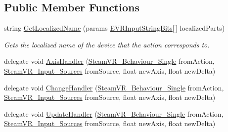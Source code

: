 \subsection*{Public Member Functions}
\begin{DoxyCompactItemize}
\item 
string \mbox{\hyperlink{class_valve_1_1_v_r_1_1_steam_v_r___behaviour___single_a352724349998074f0214563cb037a98e}{Get\+Localized\+Name}} (params \mbox{\hyperlink{namespace_valve_1_1_v_r_a05e76187bbc5846b9bfb44f6acf13912}{E\+V\+R\+Input\+String\+Bits}}\mbox{[}$\,$\mbox{]} localized\+Parts)
\begin{DoxyCompactList}\small\item\em Gets the localized name of the device that the action corresponds to. \end{DoxyCompactList}\item 
delegate void \mbox{\hyperlink{class_valve_1_1_v_r_1_1_steam_v_r___behaviour___single_ae61cad9d74c4df6b8efd9ead49b15ea9}{Axis\+Handler}} (\mbox{\hyperlink{class_valve_1_1_v_r_1_1_steam_v_r___behaviour___single}{Steam\+V\+R\+\_\+\+Behaviour\+\_\+\+Single}} from\+Action, \mbox{\hyperlink{namespace_valve_1_1_v_r_a82e5bf501cc3aa155444ee3f0662853f}{Steam\+V\+R\+\_\+\+Input\+\_\+\+Sources}} from\+Source, float new\+Axis, float new\+Delta)
\item 
delegate void \mbox{\hyperlink{class_valve_1_1_v_r_1_1_steam_v_r___behaviour___single_aa4d7e1b4579edc552044b04551e0e490}{Change\+Handler}} (\mbox{\hyperlink{class_valve_1_1_v_r_1_1_steam_v_r___behaviour___single}{Steam\+V\+R\+\_\+\+Behaviour\+\_\+\+Single}} from\+Action, \mbox{\hyperlink{namespace_valve_1_1_v_r_a82e5bf501cc3aa155444ee3f0662853f}{Steam\+V\+R\+\_\+\+Input\+\_\+\+Sources}} from\+Source, float new\+Axis, float new\+Delta)
\item 
delegate void \mbox{\hyperlink{class_valve_1_1_v_r_1_1_steam_v_r___behaviour___single_ab68f36a28374f77a1aeddacdf2194f52}{Update\+Handler}} (\mbox{\hyperlink{class_valve_1_1_v_r_1_1_steam_v_r___behaviour___single}{Steam\+V\+R\+\_\+\+Behaviour\+\_\+\+Single}} from\+Action, \mbox{\hyperlink{namespace_valve_1_1_v_r_a82e5bf501cc3aa155444ee3f0662853f}{Steam\+V\+R\+\_\+\+Input\+\_\+\+Sources}} from\+Source, float new\+Axis, float new\+Delta)
\end{DoxyCompactItemize}
